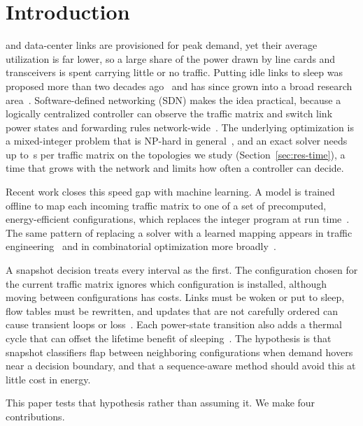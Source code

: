 \documentclass[journal]{IEEEtran}
\begin{document}
\section{Introduction}

 and data-center links are provisioned for peak demand, yet their average utilization is far lower, so a large share of the power drawn by line cards and transceivers is spent carrying little or no traffic. Putting idle links to sleep was proposed more than two decades ago~\cite{gupta2003greening} and has since grown into a broad research area~\cite{bianzino2012survey,bolla2011energy}. Software-defined networking (SDN) makes the idea practical, because a logically centralized controller can observe the traffic matrix and switch link power states and forwarding rules network-wide~\cite{mckeown2008openflow,kreutz2015sdn}. The underlying optimization is a mixed-integer problem that is NP-hard in general~\cite{chiaraviglio2012minimizing}, and an exact solver needs up to \ilpTA\,s per traffic matrix on the topologies we study (Section~\ref{sec:res-time}), a time that grows with the network and limits how often a controller can decide.

Recent work closes this speed gap with machine learning. A model is trained offline to map each incoming traffic matrix to one of a set of precomputed, energy-efficient configurations, which replaces the integer program at run time~\cite{gomezdelahiz2025noms,gomezdelahiz2026tgcn}. The same pattern of replacing a solver with a learned mapping appears in traffic engineering~\cite{xu2023teal,perry2023dote,abuzaid2021ncflow,almasan2022enero} and in combinatorial optimization more broadly~\cite{bengio2021mlco}.

A snapshot decision treats every interval as the first. The configuration chosen for the current traffic matrix ignores which configuration is installed, although moving between configurations has costs. Links must be woken or put to sleep, flow tables must be rewritten, and updates that are not carefully ordered can cause transient loops or loss~\cite{reitblatt2012abstractions,jin2014dionysus}. Each power-state transition also adds a thermal cycle that can offset the lifetime benefit of sleeping~\cite{chiaraviglio2015lifetime,chiaraviglio2014impact}. The hypothesis is that snapshot classifiers flap between neighboring configurations when demand hovers near a decision boundary, and that a sequence-aware method should avoid this at little cost in energy.

This paper tests that hypothesis rather than assuming it. We make four contributions.
\end{document}
